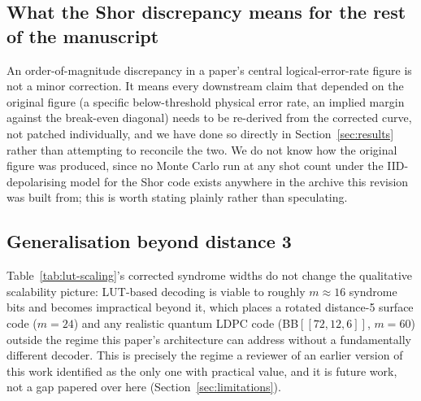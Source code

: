 \subsection{What the Shor discrepancy means for the rest of the manuscript}\label{subsec:disc-discrepancy}

An order-of-magnitude discrepancy in a paper's central logical-error-rate figure is not a minor correction. It means every downstream claim that depended on the original figure (a specific below-threshold physical error rate, an implied margin against the break-even diagonal) needs to be re-derived from the corrected curve, not patched individually, and we have done so directly in Section~\ref{sec:results} rather than attempting to reconcile the two. We do not know how the original figure was produced, since no Monte Carlo run at any shot count under the IID-depolarising model for the Shor code exists anywhere in the archive this revision was built from; this is worth stating plainly rather than speculating.

\subsection{Generalisation beyond distance 3}\label{subsec:disc-scaling}

Table~\ref{tab:lut-scaling}'s corrected syndrome widths do not change the qualitative scalability picture: LUT-based decoding is viable to roughly \(m\approx16\) syndrome bits and becomes impractical beyond it, which places a rotated distance-5 surface code (\(m=24\)) and any realistic quantum LDPC code (BB\([[72,12,6]]\), \(m=60\)) outside the regime this paper's architecture can address without a fundamentally different decoder. This is precisely the regime a reviewer of an earlier version of this work identified as the only one with practical value, and it is future work, not a gap papered over here (Section~\ref{sec:limitations}).
